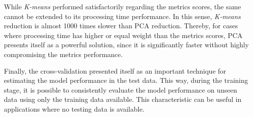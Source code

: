 \documentclass{article}
\begin{document}
While \textit{K-means} performed satisfactorily regarding the metrics scores, the same cannot be extended to its processing time performance. In this sense, \textit{K-means} reduction is almost 1000 times slower than PCA reduction. Thereby, for cases where processing time has higher or equal weight than the metrics scores, PCA presents itself as a powerful solution, since it is significantly faster without highly compromising the metrics performance.

Finally, the cross-validation presented itself as an important technique for estimating the model performance in the test data. This way, during the training stage, it is possible to consistently evaluate the model performance on unseen data using only the training data available. This characteristic can be useful in applications where no testing data is available.

\clearpage
\newpage
\printbibliography
\end{document}
